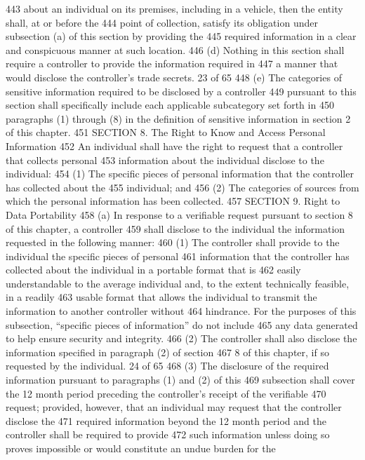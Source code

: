443 about an individual on its premises, including in a vehicle, then the entity shall, at or before the
444 point of collection, satisfy its obligation under subsection (a) of this section by providing the
445 required information in a clear and conspicuous manner at such location.
446 (d) Nothing in this section shall require a controller to provide the information required in
447 a manner that would disclose the controller’s trade secrets.
23 of 65
448 (e) The categories of sensitive information required to be disclosed by a controller
449 pursuant to this section shall specifically include each applicable subcategory set forth in
450 paragraphs (1) through (8) in the definition of sensitive information in section 2 of this chapter.
451 SECTION 8. The Right to Know and Access Personal Information
452 An individual shall have the right to request that a controller that collects personal
453 information about the individual disclose to the individual:
454 (1) The specific pieces of personal information that the controller has collected about the
455 individual; and
456 (2) The categories of sources from which the personal information has been collected.
457 SECTION 9. Right to Data Portability
458 (a) In response to a verifiable request pursuant to section 8 of this chapter, a controller
459 shall disclose to the individual the information requested in the following manner:
460 (1) The controller shall provide to the individual the specific pieces of personal
461 information that the controller has collected about the individual in a portable format that is
462 easily understandable to the average individual and, to the extent technically feasible, in a readily
463 usable format that allows the individual to transmit the information to another controller without
464 hindrance. For the purposes of this subsection, “specific pieces of information” do not include
465 any data generated to help ensure security and integrity.
466 (2) The controller shall also disclose the information specified in paragraph (2) of section
467 8 of this chapter, if so requested by the individual. 
24 of 65
468 (3) The disclosure of the required information pursuant to paragraphs (1) and (2) of this
469 subsection shall cover the 12 month period preceding the controller’s receipt of the verifiable
470 request; provided, however, that an individual may request that the controller disclose the
471 required information beyond the 12 month period and the controller shall be required to provide
472 such information unless doing so proves impossible or would constitute an undue burden for the
